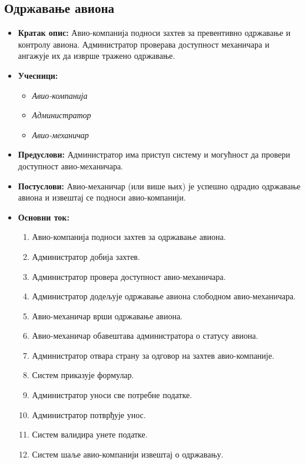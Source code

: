 \documentclass{article}
\begin{document}
\subsection{Одржавање авиона}

\begin{itemize}
    \item \textbf{Кратак опис:} Авио-компанија подноси захтев за превентивно одржавање и контролу авиона. Администратор проверава доступност механичара и ангажује их да изврше тражено одржавање.
    \item \textbf{Учесници:}
        \begin{itemize}
            \item \textit{Авио-компанија}
            \item \textit{Администратор}
            \item \textit{Авио-механичар}
        \end{itemize}
    \item \textbf{Предуслови:} Администратор има приступ систему и могућност да провери доступност авио-механичара.
    \item \textbf{Постуслови:} Авио-механичар (или више њих) је успешно одрадио одржавање авиона и извештај се подноси авио-компанији.
    \item \textbf{Основни ток:}
        \begin{enumerate}
            \item Авио-компанија подноси захтев за одржавање авиона.
            \item Администратор добија захтев.
            \item Администратор провера доступност авио-механичара.
            \item Администратор додељује одржавање авиона слободном авио-механичара.
            \item Авио-механичар врши одржавање авиона.
            \item Авио-механичар обавештава администратора о статусу авиона.
            \item Администратор отвара страну за одговор на захтев авио-компаније.
            \item Систем приказује формулар.
            \item Администратор уноси све потребне податке.
            \item Администратор потврђује унос.
            \item Систем валидира унете податке.
            \item Систем шаље авио-компанији извештај о одржавању.
        \end{enumerate}
        

\end{itemize}
\end{document}
